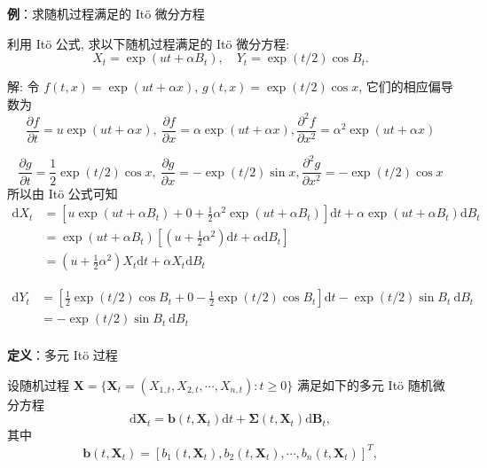 \documentclass[openany]{ctexbook}
\theoremstyle{kaiti}
\theoremstyle{normal}
\begin{document}
\textbf{例}：求随机过程满足的 It\"o 微分方程

利用 It\"o 公式, 求以下随机过程满足的 It\"o 微分方程:
\begin{equation}X_t=\exp(ut+\alpha B_t),\quad Y_t=\exp(t/2)\cos B_t.\end{equation}

解:  令 $f(t,x)=\exp(ut+\alpha x)$, $g(t,x)=\exp(t/2)\cos x$, 它们的相应偏导数为
\begin{equation}
  \frac{\partial f}{\partial t}=u\exp(ut+\alpha x),~\frac{\partial f}{\partial x}=\alpha\exp(ut+\alpha x),\frac{\partial^2 f}{\partial x^2}=\alpha^2\exp(ut+\alpha x)
\end{equation}

\begin{equation}
  \frac{\partial g}{\partial t}=\frac{1}{2}\exp(t/2)\cos x,~\frac{\partial g}{\partial x}=-\exp(t/2)\sin x,\frac{\partial^2 g}{\partial x^2}=-\exp(t/2)\cos x
\end{equation}
所以由 It\"o 公式可知
\begin{equation}
  \begin{aligned}
    \mathrm{d}X_t&=\left[u\exp(ut+\alpha B_t)+0+\frac{1}{2}\alpha^2\exp(ut+\alpha B_t)\right]\mathrm{d}t+\alpha\exp(ut+\alpha B_t)\mathrm{d}B_t\\
    &=\exp(ut+\alpha B_t)\left[\left(u+\frac{1}{2}\alpha^2\right)\mathrm{d}t+\alpha\mathrm{d}B_t\right]\\
    &=\left(u+\frac{1}{2}\alpha^2\right)X_t\mathrm{d}t+\alpha X_t\mathrm{d}B_t
  \end{aligned}
\end{equation}

\begin{equation}
  \begin{aligned}
    \mathrm{d}Y_t&=\left[\frac{1}{2}\exp(t/2)\cos B_t+0-\frac{1}{2}\exp(t/2)\cos B_t\right]\mathrm{d}t-\exp(t/2)\sin B_t~\mathrm{d}B_t\\
    &=-\exp(t/2)\sin B_t~\mathrm{d}B_t\\
  \end{aligned}
\end{equation}

\textbf{定义}：多元 It\"o 过程

设随机过程 $\bm{X}=\{\bm{X}_t=(X_{1,t},X_{2,t},\cdots,X_{n,t}):t\geqslant0\}$ 满足如下的多元 It\"o 随机微分方程
\begin{equation}
  \mathrm{d}\bm{X}_t=\bm{b}(t,\bm{X}_t)\mathrm{d}t+\bm{\Sigma}(t,\bm{X}_t)\mathrm{d}\bm{B}_t,
\end{equation}
其中
\begin{equation}
  \bm{b}(t,\bm{X}_t)=[b_1(t,\bm{X}_t),b_2(t,\bm{X}_t),\cdots,b_n(t,\bm{X}_t)]^T,
\end{equation}
\end{document}
